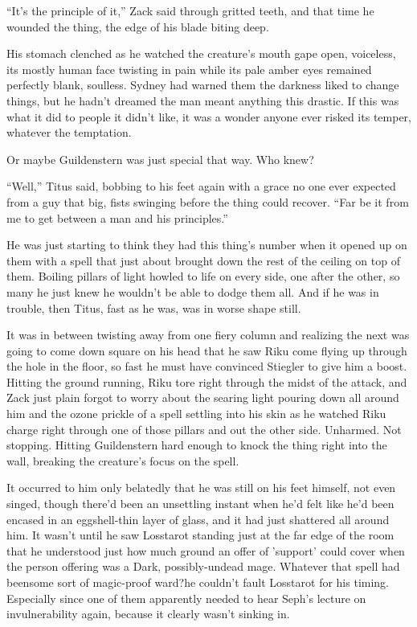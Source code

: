 ``It's the principle of it,'' Zack said through gritted teeth, and that time he wounded the thing, the edge of his blade biting deep.

His stomach clenched as he watched the creature's mouth gape open, voiceless, its mostly human face twisting in pain while its pale amber eyes remained perfectly blank, soulless. Sydney had warned them the darkness liked to change things, but he hadn't dreamed the man meant anything this drastic. If this was what it did to people it didn't like, it was a wonder anyone ever risked its temper, whatever the temptation.

Or maybe Guildenstern was just special that way. Who knew?

``Well,'' Titus said, bobbing to his feet again with a grace no one ever expected from a guy that big, fists swinging before the thing could recover. ``Far be it from me to get between a man and his principles.''

He was just starting to think they had this thing's number when it opened up on them with a spell that just about brought down the rest of the ceiling on top of them. Boiling pillars of light howled to life on every side, one after the other, so many he just knew he wouldn't be able to dodge them all. And if he was in trouble, then Titus, fast as he was, was in worse shape still.

It was in between twisting away from one fiery column and realizing the next was going to come down square on his head that he saw Riku come flying up through the hole in the floor, so fast he must have convinced Stiegler to give him a boost. Hitting the ground running, Riku tore right through the midst of the attack, and Zack just plain forgot to worry about the searing light pouring down all around him and the ozone prickle of a spell settling into his skin as he watched Riku charge right through one of those pillars and out the other side. Unharmed. Not stopping. Hitting Guildenstern hard enough to knock the thing right into the wall, breaking the creature's focus on the spell.

It occurred to him only belatedly that he was still on his feet himself, not even singed, though there'd been an unsettling instant when he'd felt like he'd been encased in an eggshell-thin layer of glass, and it had just shattered all around him. It wasn't until he saw Losstarot standing just at the far edge of the room that he understood just how much ground an offer of 'support' could cover when the person offering was a Dark, possibly-undead mage. Whatever that spell had been\textemdash some sort of magic-proof ward?\textemdash he couldn't fault Losstarot for his timing. Especially since one of them apparently needed to hear Seph's lecture on invulnerability again, because it clearly wasn't sinking in.

